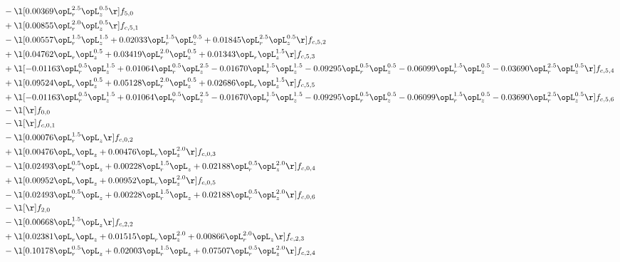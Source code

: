 \begin{alignat}{2}
& - \l[  0.00369 \opL_r^{2.5} \opL_z^{0.5}  \r] f_{5,0} \nonumber \\ 
& + \l[  0.00855 \opL_r^{2.0} \opL_z^{0.5}  \r] f_{c,5,1} \nonumber \\ 
& - \l[  0.00557 \opL_r^{1.5} \opL_z^{1.5} +  0.02033 \opL_r^{1.5} \opL_z^{0.5} +  0.01845 \opL_r^{2.5} \opL_z^{0.5}  \r] f_{c,5,2} \nonumber \\ 
& + \l[  0.04762 \opL_r \opL_z^{0.5} +  0.03419 \opL_r^{2.0} \opL_z^{0.5} +  0.01343 \opL_r \opL_z^{1.5}  \r] f_{c,5,3} \nonumber \\ 
& + \l[  -0.01163 \opL_r^{0.5} \opL_z^{1.5} +  0.01064 \opL_r^{0.5} \opL_z^{2.5}   -0.01670 \opL_r^{1.5} \opL_z^{1.5}   -0.09295 \opL_r^{0.5} \opL_z^{0.5}   -0.06099 \opL_r^{1.5} \opL_z^{0.5}   -0.03690 \opL_r^{2.5} \opL_z^{0.5}  \r] f_{c,5,4} \nonumber \\ 
& + \l[  0.09524 \opL_r \opL_z^{0.5} +  0.05128 \opL_r^{2.0} \opL_z^{0.5} +  0.02686 \opL_r \opL_z^{1.5}  \r] f_{c,5,5} \nonumber \\ 
& + \l[  -0.01163 \opL_r^{0.5} \opL_z^{1.5} +  0.01064 \opL_r^{0.5} \opL_z^{2.5}   -0.01670 \opL_r^{1.5} \opL_z^{1.5}   -0.09295 \opL_r^{0.5} \opL_z^{0.5}   -0.06099 \opL_r^{1.5} \opL_z^{0.5}   -0.03690 \opL_r^{2.5} \opL_z^{0.5}  \r] f_{c,5,6} \nonumber \\ 
& - \l[  \r] f_{0,0} \nonumber \\ 
& - \l[  \r] f_{c,0,1} \nonumber \\ 
& - \l[  0.00076 \opL_r^{1.5} \opL_z  \r] f_{c,0,2} \nonumber \\ 
& + \l[  0.00476 \opL_r \opL_z +  0.00476 \opL_r \opL_z^{2.0}  \r] f_{c,0,3} \nonumber \\ 
& - \l[  0.02493 \opL_r^{0.5} \opL_z +  0.00228 \opL_r^{1.5} \opL_z +  0.02188 \opL_r^{0.5} \opL_z^{2.0}  \r] f_{c,0,4} \nonumber \\ 
& + \l[  0.00952 \opL_r \opL_z +  0.00952 \opL_r \opL_z^{2.0}  \r] f_{c,0,5} \nonumber \\ 
& - \l[  0.02493 \opL_r^{0.5} \opL_z +  0.00228 \opL_r^{1.5} \opL_z +  0.02188 \opL_r^{0.5} \opL_z^{2.0}  \r] f_{c,0,6} \nonumber \\ 
& - \l[  \r] f_{2,0} \nonumber \\ 
& - \l[  0.00668 \opL_r^{1.5} \opL_z  \r] f_{c,2,2} \nonumber \\ 
& + \l[  0.02381 \opL_r \opL_z +  0.01515 \opL_r \opL_z^{2.0} +  0.00866 \opL_r^{2.0} \opL_z  \r] f_{c,2,3} \nonumber \\ 
& - \l[  0.10178 \opL_r^{0.5} \opL_z +  0.02003 \opL_r^{1.5} \opL_z +  0.07507 \opL_r^{0.5} \opL_z^{2.0}  \r] f_{c,2,4} \nonumber \\ 

\end{alignat}

